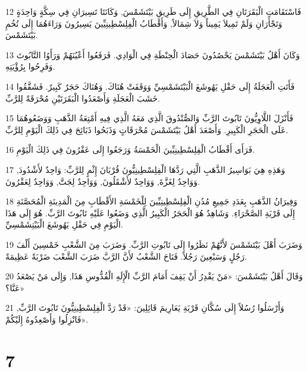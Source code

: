 \par 12 فَاسْتَقَامَتِ الْبَقَرَتَانِ فِي الطَّرِيقِ إِلَى طَرِيقِ بَيْتَشَمْسَ, وَكَانَتَا تَسِيرَانِ فِي سِكَّةٍ وَاحِدَةٍ وَتَجْأَرَانِ وَلَمْ تَمِيلاَ يَمِيناً وَلاَ شِمَالاً, وَأَقْطَابُ الْفِلِسْطِينِيِّينَ يَسِيرُونَ وَرَاءَهُمَا إِلَى تُخُمِ بَيْتَشَمْسَ.
\par 13 وَكَانَ أَهْلُ بَيْتَشَمْسَ يَحْصُدُونَ حَصَادَ الْحِنْطَةِ فِي الْوَادِي. فَرَفَعُوا أَعْيُنَهُمْ وَرَأَوُا التَّابُوتَ وَفَرِحُوا بِرُؤْيَتِهِ.
\par 14 فَأَتَتِ الْعَجَلَةُ إِلَى حَقْلِ يَهُوشَعَ الْبَيْتَشَمْسِيِّ وَوَقَفَتْ هُنَاكَ. وَهُنَاكَ حَجَرٌ كَبِيرٌ. فَشَقَّقُوا خَشَبَ الْعَجَلَةِ وَأَصْعَدُوا الْبَقَرَتَيْنِ مُحْرَقَةً لِلرَّبِّ.
\par 15 فَأَنْزَلَ اللَّاوِيُّونَ تَابُوتَ الرَّبِّ وَالصُّنْدُوقَ الَّذِي مَعَهُ الَّذِي فِيهِ أَمْتِعَةُ الذَّهَبِ وَوَضَعُوهُمَا عَلَى الْحَجَرِ الْكَبِيرِ. وَأَصْعَدَ أَهْلُ بَيْتَشَمْسَ مُحْرَقَاتٍ وَذَبَحُوا ذَبَائِحَ فِي ذَلِكَ الْيَوْمِ لِلرَّبِّ.
\par 16 فَرَأَى أَقْطَابُ الْفِلِسْطِينِيِّينَ الْخَمْسَةُ وَرَجَعُوا إِلَى عَقْرُونَ فِي ذَلِكَ الْيَوْمِ.
\par 17 وَهَذِهِ هِيَ بَوَاسِيرُ الذَّهَبِ الَّتِي رَدَّهَا الْفِلِسْطِينِيُّونَ قُرْبَانَ إِثْمٍ لِلرَّبِّ: وَاحِدٌ لأَشْدُودَ, وَوَاحِدٌ لِغَزَّةَ, وَوَاحِدٌ لأَشْقَلُونَ, وَوَاحِدٌ لِجَتَّ, وَوَاحِدٌ لِعَقْرُونَ.
\par 18 وَفِيرَانُ الذَّهَبِ بِعَدَدِ جَمِيعِ مُدُنِ الْفِلِسْطِينِيِّينَ لِلْخَمْسَةِ الأَقْطَابِ مِنَ الْمَدِينَةِ الْمُحَصَّنَةِ إِلَى قَرْيَةِ الصَّحْرَاءِ. وَشَاهِدٌ هُوَ الْحَجَرُ الْكَبِيرُ الَّذِي وَضَعُوا عَلَيْهِ تَابُوتَ الرَّبِّ. هُوَ إِلَى هَذَا الْيَوْمِ فِي حَقْلِ يَهُوشَعَ الْبَيْتِشَمْسِيِّ.
\par 19 وَضَرَبَ أَهْلَ بَيْتَشَمْسَ لأَنَّهُمْ نَظَرُوا إِلَى تَابُوتِ الرَّبِّ. وَضَرَبَ مِنَ الشَّعْبِ خَمْسِينَ أَلْفَ رَجُلٍ وَسَبْعِينَ رَجُلاً. فَنَاحَ الشَّعْبُ لأَنَّ الرَّبَّ ضَرَبَ الشَّعْبَ ضَرْبَةً عَظِيمَةً.
\par 20 وَقَالَ أَهْلُ بَيْتَشَمْسَ: «مَنْ يَقْدِرُ أَنْ يَقِفَ أَمَامَ الرَّبِّ الْإِلَهِ الْقُدُّوسِ هَذَا, وَإِلَى مَنْ يَصْعَدُ عَنَّا؟»
\par 21 وَأَرْسَلُوا رُسُلاً إِلَى سُكَّانِ قَرْيَةِ يَعَارِيمَ قَائِلِينَ: «قَدْ رَدَّ الْفِلِسْطِينِيُّونَ تَابُوتَ الرَّبِّ, فَانْزِلُوا وَأَصْعِدُوهُ إِلَيْكُمْ».

\chapter{7}

